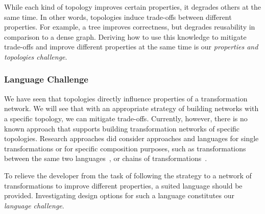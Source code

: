 While each kind of topology improves certain properties, it degrades others at the same time.
In other words, topologies induce trade-offs between different properties.
For example, a tree improves correctness, but degrades reusability in comparison to a dense graph.
Deriving how to use this knowledge to mitigate trade-offs and improve different properties at the same time is our \emph{properties and topologies challenge}.

\subsubsection*{Language Challenge}

We have seen that topologies directly influence properties of a transformation network.
We will see that with an appropriate strategy of building networks with a specific topology, we can mitigate trade-offs.
Currently, however, there is no known approach that supports building transformation networks of specific topologies.
Research approaches did consider approaches and languages for single transformations or for specific composition purposes, such as transformations between the same two languages~\cite{wagelaar2010a,wagelaar2011a}, or chains of transformations~\cite{pilgrim2008a, vanhooff2007UniTI-MODELS}.

To relieve the developer from the task of following the strategy to a network of transformations to improve different properties, a suited language should be provided.
Investigating design options for such a language constitutes our \emph{language challenge}.

